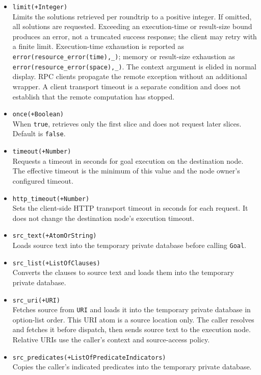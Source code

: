 \begin{itemize}
\item
  \texttt{limit(\allowbreak{}+Integer)}\\
  Limits the solutions retrieved per roundtrip to a positive integer.
  If omitted, all solutions are requested. Exceeding an execution-time or
  result-size bound produces an error, not a truncated success response;
  the client may retry with a finite limit. Execution-time exhaustion is reported as
\texttt{error(\allowbreak{}resource\_\allowbreak{}error(\allowbreak{}time),\allowbreak{}\_\allowbreak{})}; memory or result-size exhaustion
as \texttt{error(\allowbreak{}resource\_\allowbreak{}error(\allowbreak{}space),\allowbreak{}\_\allowbreak{})}. The context argument is
elided in normal display. RPC clients propagate the remote exception
without an additional wrapper. A client transport timeout is a separate
condition and does not establish that the remote computation has stopped.
\item
  \texttt{once(\allowbreak{}+Boolean)}\\
  When \texttt{true}, retrieves only the first slice and does not request later
  slices. Default is \texttt{false}.
\item
  \texttt{timeout(\allowbreak{}+Number)}\\
  Requests a timeout in seconds for goal execution on the destination node.
  The effective timeout is the minimum of this value and the node owner's
  configured timeout.
\item
  \texttt{http\_\allowbreak{}timeout(\allowbreak{}+Number)}\\
  Sets the client-side HTTP transport timeout in seconds for each request. It
  does not change the destination node's execution timeout.
\item
  \texttt{src\_\allowbreak{}text(\allowbreak{}+AtomOrString)}\\
  Loads source text into the temporary private database before calling
  \texttt{Goal}.
\item
  \texttt{src\_\allowbreak{}list(\allowbreak{}+ListOfClauses)}\\
  Converts the clauses to source text and loads them into the temporary private
  database.
\item
  \texttt{src\_\allowbreak{}uri(\allowbreak{}+URI)}\\
  Fetches source from \texttt{URI} and loads it into the temporary private
  database in option-list order. This URI atom is a source location only.
  The caller resolves and fetches it before dispatch, then sends source text
  to the execution node. Relative URIs use the caller's context and
  source-access policy.
\item
  \texttt{src\_\allowbreak{}predicates(\allowbreak{}+ListOfPredicateIndicators)}\\
  Copies the caller's indicated predicates into the temporary private database.
\end{itemize}


